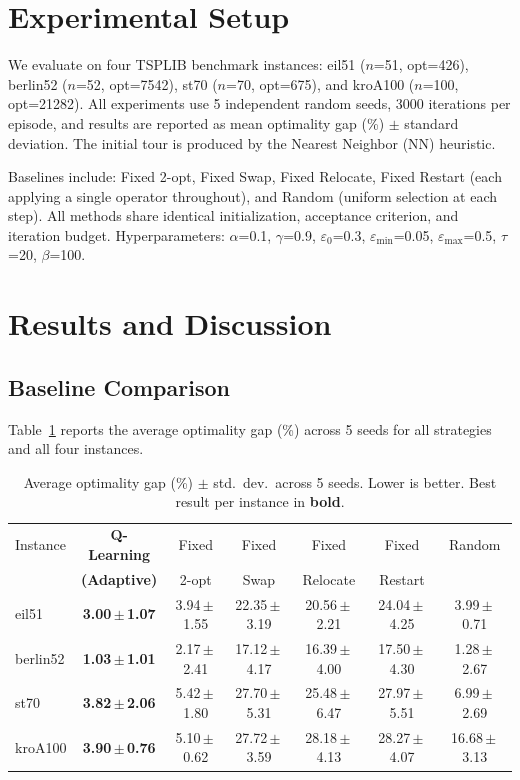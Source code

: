 \documentclass{article}
\begin{document}
\section{Experimental Setup}

We evaluate on four TSPLIB benchmark instances: eil51 ($n$=51, opt=426),
berlin52 ($n$=52, opt=7542), st70 ($n$=70, opt=675), and kroA100 ($n$=100,
opt=21282). All experiments use 5 independent random seeds, 3000 iterations per
episode, and results are reported as mean optimality gap (\%) $\pm$ standard
deviation. The initial tour is produced by the Nearest Neighbor (NN) heuristic.

Baselines include: Fixed 2-opt, Fixed Swap, Fixed Relocate, Fixed Restart (each
applying a single operator throughout), and Random (uniform selection at each
step). All methods share identical initialization, acceptance criterion, and
iteration budget. Hyperparameters: $\alpha$=0.1, $\gamma$=0.9, $\varepsilon_0$=0.3,
$\varepsilon_{\min}$=0.05, $\varepsilon_{\max}$=0.5, $\tau$=20, $\beta$=100.

\section{Results and Discussion}

\subsection{Baseline Comparison}

Table~\ref{tab:main} reports the average optimality gap (\%) across 5 seeds for
all strategies and all four instances.

\begin{table}[h]
\centering
\caption{Average optimality gap (\%) $\pm$ std.\ dev.\ across 5 seeds. Lower is better. Best result per instance in \textbf{bold}.}
\label{tab:main}
\small
\begin{tabular}{lcccccc}
\toprule
Instance & \textbf{Q-Learning} & Fixed & Fixed & Fixed & Fixed & Random \\
         & \textbf{(Adaptive)} & 2-opt & Swap  & Relocate & Restart & \\
\midrule
eil51    & \textbf{3.00\,$\pm$\,1.07} & 3.94\,$\pm$\,1.55 & 22.35\,$\pm$\,3.19 & 20.56\,$\pm$\,2.21 & 24.04\,$\pm$\,4.25 & 3.99\,$\pm$\,0.71 \\
berlin52 & \textbf{1.03\,$\pm$\,1.01} & 2.17\,$\pm$\,2.41 & 17.12\,$\pm$\,4.17 & 16.39\,$\pm$\,4.00 & 17.50\,$\pm$\,4.30 & 1.28\,$\pm$\,2.67 \\
st70     & \textbf{3.82\,$\pm$\,2.06} & 5.42\,$\pm$\,1.80 & 27.70\,$\pm$\,5.31 & 25.48\,$\pm$\,6.47 & 27.97\,$\pm$\,5.51 & 6.99\,$\pm$\,2.69 \\
kroA100  & \textbf{3.90\,$\pm$\,0.76} & 5.10\,$\pm$\,0.62 & 27.72\,$\pm$\,3.59 & 28.18\,$\pm$\,4.13 & 28.27\,$\pm$\,4.07 & 16.68\,$\pm$\,3.13 \\
\bottomrule
\end{tabular}
\end{table}
\end{document}
